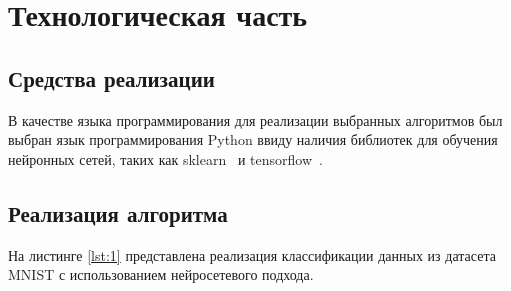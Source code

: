 \chapter{Технологическая часть}

\section{Средства реализации}

В качестве языка программирования для реализации выбранных алгоритмов был выбран язык программирования Python \cite{pythonlang} ввиду наличия библиотек для обучения нейронных сетей, таких как sklearn~\cite{sklearn} и tensorflow~\cite{tf}.

\section{Реализация алгоритма}

На листинге \ref{lst:1} представлена реализация классификации данных из датасета MNIST с использованием нейросетевого подхода.

